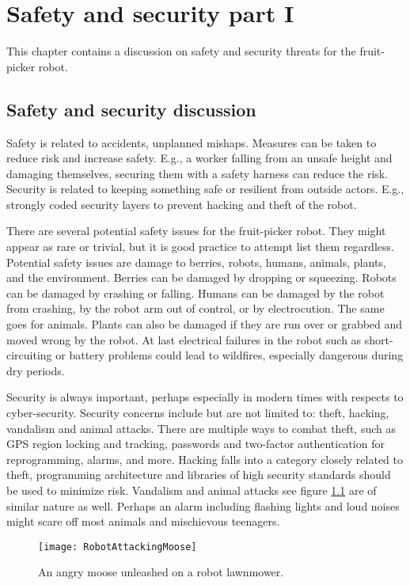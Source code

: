 \documentclass[%
oneside,    %
project,    %
nosummary   %
]{USN-MSc}
\begin{document}
\chapter{Safety and security part I}
\label{ch:safety1}
This chapter contains a discussion on safety and security threats for the fruit-picker robot.
\section{Safety and security discussion}

Safety is related to accidents, unplanned mishaps. Measures can be taken to reduce risk and increase safety. E.g., a worker falling from an unsafe height and damaging themselves, securing them with a safety harness can reduce the risk.
Security is related to keeping something safe or resilient from outside actors. E.g., strongly coded security layers to prevent hacking and theft of the robot.

There are several potential safety issues for the fruit-picker robot. They might appear as rare or trivial, but it is good practice to attempt list them regardless.
Potential safety issues are damage to berries, robots, humans, animals, plants, and the environment. Berries can be damaged by dropping or squeezing. Robots can be damaged by crashing or falling. Humans can be damaged by the robot from crashing, by the robot arm out of control, or by electrocution. The same goes for animals. Plants can also be damaged if they are run over or grabbed and moved wrong by the robot. At last electrical failures in the robot such as short-circuiting or battery problems could lead to wildfires, especially dangerous during dry periods.

Security is always important, perhaps especially in modern times with respects to cyber-security. Security concerns include but are not limited to: theft, hacking, vandalism and animal attacks. There are multiple ways to combat theft, such as GPS region locking and tracking, passwords and two-factor authentication for reprogramming, alarms, and more. Hacking falls into a category closely related to theft, programming architecture and libraries of high security standards should be used to minimize risk. Vandalism and animal attacks see figure \ref{fig:anAngryMoose} are of similar nature as well. Perhaps an alarm including flashing lights and loud noises might scare off most animals and mischievous teenagers. 

\begin{figure}[!ht]
  \centering
  \texttt{[image: RobotAttackingMoose]}
  \caption{An angry moose unleashed on a robot lawnmower.}
  \label{fig:anAngryMoose}
\end{figure}
\end{document}

